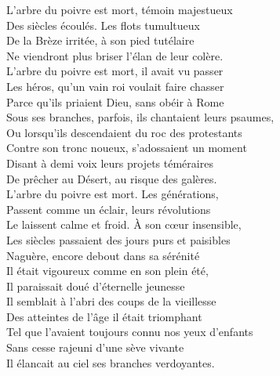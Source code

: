 \begin{center}
\end{center}


\begin{center}
\begin{minipage}{0.55\textwidth}
L’arbre du poivre est mort, témoin majestueux\\
Des siècles écoulés. Les flots tumultueux\\
De la Brèze irritée, à son pied tutélaire\\
Ne viendront plus briser l’élan de leur colère.\\


L’arbre du poivre est mort, il avait vu passer\\
Les héros, qu’un vain roi voulait faire chasser\\
Parce qu’ils priaient Dieu, sans obéir à Rome\\
Sous ses branches, parfois, ils chantaient leurs psaumes,\\


Ou lorsqu’ils descendaient du roc des protestants\\
Contre son tronc noueux, s’adossaient un moment\\
Disant à demi voix leurs projets téméraires\\
De prêcher au Désert, au risque des galères.\\


L’arbre du poivre est mort. Les générations,\\
Passent comme un éclair, leurs révolutions\\
Le laissent calme et froid. À son cœur insensible,\\
Les siècles passaient des jours purs et paisibles\\


Naguère, encore debout dans sa sérénité\\
Il était vigoureux comme en son plein été,\\
Il paraissait doué d’éternelle jeunesse\\
Il semblait à l’abri des coups de la vieillesse\\


Des atteintes de l’âge il était triomphant\\
Tel que l’avaient toujours connu nos yeux d’enfants\\
Sans cesse rajeuni d’une sève vivante\\
Il élancait au ciel ses branches verdoyantes.\\
\end{minipage}
\end{center}

